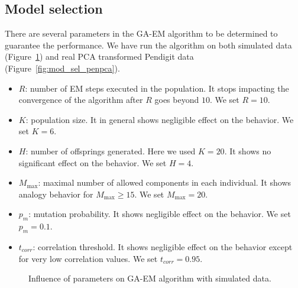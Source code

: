 \documentclass{article} %
\begin{document}
\subsection{Model selection}

There are several parameters in the GA-EM algorithm to be determined to guarantee the performance. We have run the algorithm on both simulated data (Figure~\ref{fig:mod_sel_syn}) and real PCA transformed Pendigit data (Figure~\ref{fig:mod_sel_penpca}).

\begin{itemize}
\item $R$: number of EM steps executed in the population. It stops impacting the convergence of the algorithm after $R$ goes beyond $10$. We set $R=10$.
\item $K$: population size. It in general shows negligible effect on the behavior. We set $K=6$.
\item $H$: number of offsprings generated. Here we used $K = 20$. It shows no significant effect on the behavior. We set $H=4$.
\item $M_{\max}$: maximal number of allowed components in each individual. It shows analogy behavior for $M_{\max} \geq 15$. We set $M_{\max} = 20$.
\item $p_m$: mutation probability. It shows negligible effect on the behavior. We set $p_m=0.1$.
\item $t_{corr}$: correlation threshold. It shows negligible effect on the behavior except for very low correlation values. We set $t_{corr}=0.95$.
\end{itemize}

\begin{figure}[h]
\begin{center}
\end{center}
\caption{Influence of parameters on GA-EM algorithm with simulated data.}
\label{fig:mod_sel_syn}
\end{figure}
\end{document}
